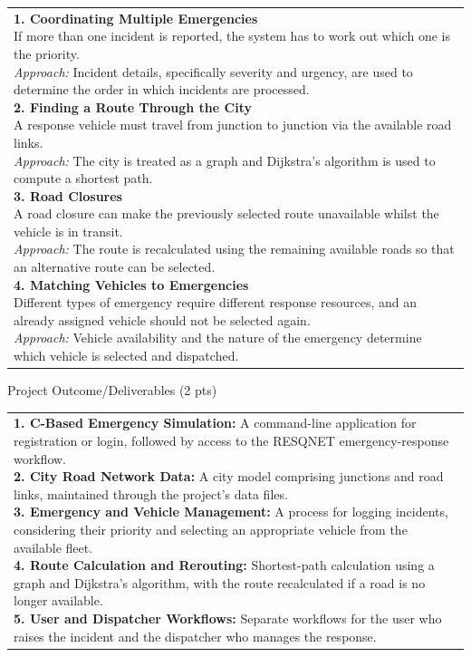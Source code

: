 \documentclass[12pt,a4paper]{article}
\newcommand{\sectiontitle}[1]{%
    {\color{GEUBlue}
    \fontsize{18}{22}\selectfont #1}
}
\newcommand{\answerbox}[2]{%
    \noindent
    \begin{tabularx}{\textwidth}{
        |>{\raggedright\arraybackslash}X|}
        \hline
        \parbox[t]{\dimexpr\linewidth-12pt\relax}{%
            \vspace{5pt}
            \fontsize{11}{13}\selectfont #2
            \vspace{5pt}
        }\\
        \hline
    \end{tabularx}
}
\begin{document}
\answerbox{7.00cm}{%
\textbf{1. Coordinating Multiple Emergencies}\\
If more than one incident is reported, the system has to work out which one
is the priority.\\
\textit{Approach:} Incident details, specifically severity and urgency, are
used to determine the order in which incidents are processed.\\[6pt]
\textbf{2. Finding a Route Through the City}\\
A response vehicle must travel from junction to junction via the available
road links.\\
\textit{Approach:} The city is treated as a graph and Dijkstra's algorithm is
used to compute a shortest path.\\[6pt]
\textbf{3. Road Closures}\\
A road closure can make the previously selected route unavailable whilst the
vehicle is in transit.\\
\textit{Approach:} The route is recalculated using the remaining available
roads so that an alternative route can be selected.\\[6pt]
\textbf{4. Matching Vehicles to Emergencies}\\
Different types of emergency require different response resources, and an
already assigned vehicle should not be selected again.\\
\textit{Approach:} Vehicle availability and the nature of the emergency
determine which vehicle is selected and dispatched.
}

\newpage

\vspace*{0.20cm}

\sectiontitle{Project Outcome/Deliverables (2 pts)}

\vspace{0.40cm}

\answerbox{6.00cm}{%
\textbf{1. C-Based Emergency Simulation:} A command-line application for
registration or login, followed by access to the RESQNET emergency-response
workflow.\\[4pt]
\textbf{2. City Road Network Data:} A city model comprising junctions and
road links, maintained through the project's data files.\\[4pt]
\textbf{3. Emergency and Vehicle Management:} A process for logging incidents,
considering their priority and selecting an appropriate vehicle from the
available fleet.\\[4pt]
\textbf{4. Route Calculation and Rerouting:} Shortest-path calculation using
a graph and Dijkstra's algorithm, with the route recalculated if a road is no
longer available.\\[4pt]
\textbf{5. User and Dispatcher Workflows:} Separate workflows for the user
who raises the incident and the dispatcher who manages the response.
}
\end{document}
